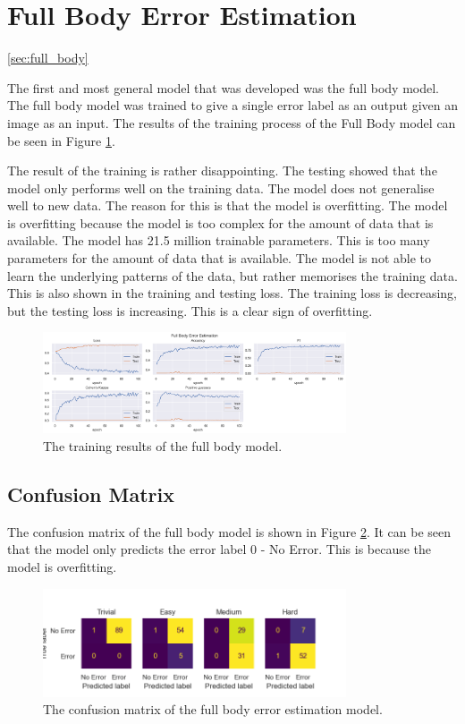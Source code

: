 \section{Full Body Error Estimation}
\ref{sec:full_body}

The first and most general model that was developed was the full body model. The full body model was trained to give a single error label as an output given an image as an input. The results of the training process of the Full Body model can be seen in Figure \ref{fig:full_body_training_results}.

The result of the training is rather disappointing. The testing showed that the model only performs well on the training data. The model does not generalise well to new data. The reason for this is that the model is overfitting. The model is overfitting because the model is too complex for the amount of data that is available. The model has 21.5 million trainable parameters. This is too many parameters for the amount of data that is available. The model is not able to learn the underlying patterns of the data, but rather memorises the training data. This is also shown in the training and testing loss. The training loss is decreasing, but the testing loss is increasing. This is a clear sign of overfitting.

\begin{figure}
  \centering
  \includegraphics[width=0.8\textwidth]{figures/Results/fb/FullBodyErrorEstimation.png}
  \caption[Full Body model training results]{The training results of the full body model.}
  \label{fig:full_body_training_results}
\end{figure}

\subsection{Confusion Matrix}

The confusion matrix of the full body model is shown in Figure \ref{fig:full_body_confusion_matrix}. It can be seen that the model only predicts the error label $0$ - No Error. This is because the model is overfitting.

\begin{figure}
  \centering
  \includegraphics[width=0.8\textwidth]{figures/results/confusion/full.png}
  \caption[Full Body model confusion matrix]{The confusion matrix of the full body error estimation model.}
  \label{fig:full_body_confusion_matrix}
\end{figure}